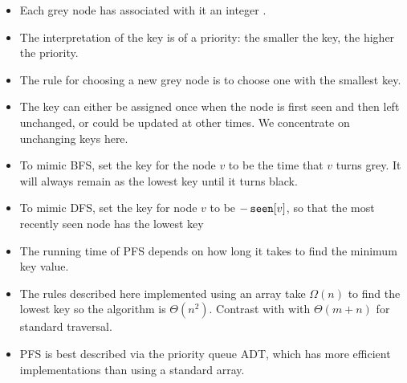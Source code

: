 \begin{itemize}
	\item Each grey node has associated with it an integer . 
	\item The interpretation of the key is of a priority: 
	the smaller the key, the higher the priority. 
	\item The rule for choosing a new grey node is to choose one with the smallest key.  
	\item The key can either be assigned once when the node is first seen and then left unchanged, 
	or could be updated at other times. We concentrate on unchanging keys here.
	\item To mimic BFS, set the key for the node $v$ to be the time that $v$ turns grey. 
	It will always remain as the lowest key until it turns black.
	\item To mimic DFS, set the key for node $v$ to be $-\seen[v]$, 
	so that the most recently seen node has the lowest key
	\item The running time of PFS depends on how long it takes to find the minimum key value.
	\item The rules described here implemented using an array take $\Omega(n)$ to find the lowest key 
	so the algorithm is $\Theta(n^2)$. Contrast with with $\Theta(m+n)$ for standard traversal.
	\item PFS is best described via the priority queue ADT, 
	which has more efficient implementations than using a standard array.
\end{itemize}


%
%
%

